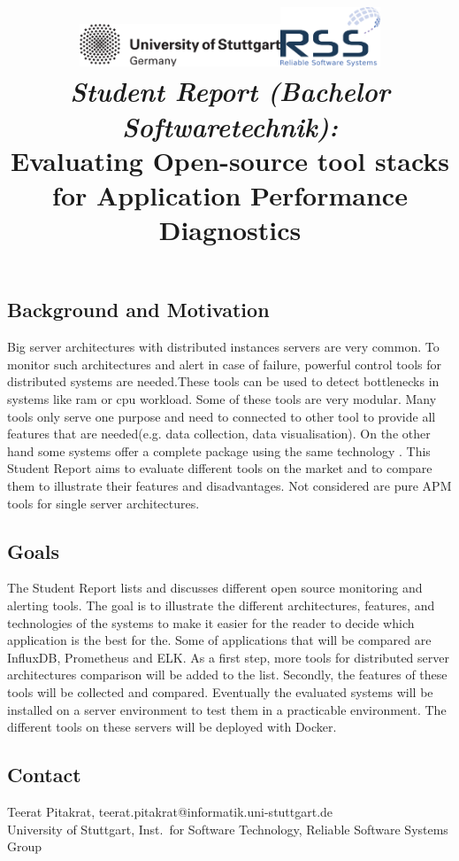 \documentclass[a4paper,12pt]{article}
\date{}
\title{
\includegraphics[width=6cm]{figures/stuttgart-vector.pdf}\hfill{\includegraphics[width=3cm]{figures/rss_logo.pdf}}
\quad \\ [0.5cm]
{\large \textit{Student Report (Bachelor Softwaretechnik):}} \\ [1mm]
{\Large Evaluating Open-source tool stacks for Application Performance Diagnostics}
}
\begin{document}
	

\maketitle

\thispagestyle{empty}

\vspace{-2.5cm}


\subsection*{Background and Motivation}
Big server architectures with distributed instances servers are very common. To monitor such architectures and alert in case of failure, powerful control tools for distributed systems are needed.These tools can be used to detect bottlenecks in systems like ram or cpu workload. Some of these tools are very modular. Many tools only serve one purpose and need to connected to other tool to provide all features that are needed(e.g. data collection, data visualisation). On the other hand some systems offer a complete package using the same technology \cite{Heger2017}.
This Student Report aims to evaluate different tools on the market and to compare them to illustrate their features and disadvantages. 
Not considered are pure APM tools for single server architectures.

\subsection*{Goals}
The Student Report lists and discusses different open source monitoring and alerting tools. The goal is to illustrate the different architectures, features, and technologies of the systems to make it easier for the reader to decide which application is the best for the.
Some of applications that will be compared are InfluxDB\cite{InfluxDB}, Prometheus\cite{Prometheus}  and ELK. As a first step, more tools for distributed server architectures comparison will be added to the list.
Secondly, the features of these tools will be collected and compared. Eventually the evaluated systems will be installed on a server environment to test them in a practicable environment. The different tools on these servers will be deployed with Docker.


\begin{scriptsize}


\end{scriptsize}

\subsection*{Contact}
Teerat Pitakrat, teerat.pitakrat@informatik.uni-stuttgart.de \\
University of Stuttgart, Inst.\ for Software Technology, Reliable Software Systems Group \\
\end{document}

